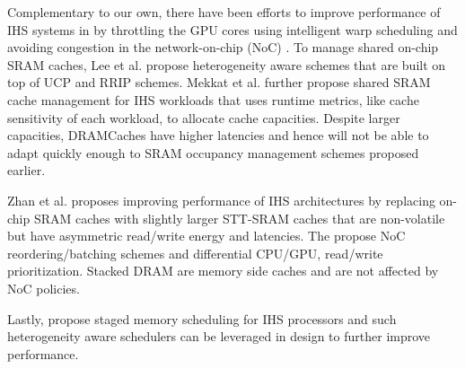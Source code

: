 \par Complementary to our own, there have been efforts to improve performance of IHS systems in \cite{gpu-concurrency} by throttling the GPU cores using intelligent warp scheduling and avoiding congestion in the network-on-chip (NoC) \cite{interconnect}. To manage shared on-chip SRAM caches, Lee et al. \cite{tap} propose heterogeneity aware schemes that are built on top of UCP and RRIP schemes. Mekkat et al. \cite{helm} further propose shared SRAM cache management for IHS workloads that uses runtime metrics, like cache sensitivity of each workload, to allocate cache capacities. Despite larger capacities, DRAMCaches have higher latencies and hence will not be able to adapt quickly enough to SRAM occupancy management schemes proposed earlier.
\par Zhan et al. \cite{oscar} proposes improving performance of IHS architectures by replacing on-chip SRAM caches with slightly larger STT-SRAM caches that are non-volatile but have asymmetric read/write energy and latencies. The propose NoC reordering/batching schemes and differential CPU/GPU, read/write prioritization. Stacked DRAM are memory side caches and are not affected by NoC policies. 
\par Lastly, \cite{sms} propose staged memory scheduling for IHS processors and such heterogeneity aware schedulers can be leveraged in \cachename design to further improve performance.
